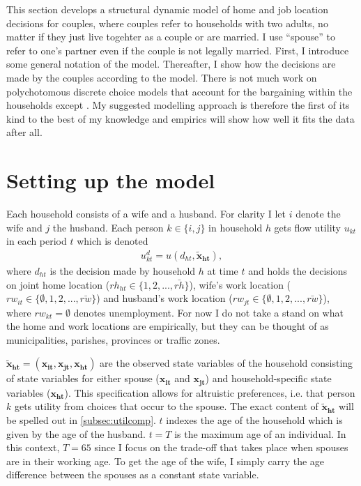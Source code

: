 This section develops a structural dynamic model of home and job location decisions for couples, where couples refer to households with two adults, no matter if they just live togehter as a couple or are married. I use ``spouse'' to refer to one's partner even if the couple is not legally married. First, I introduce some general notation of the model. Thereafter, I show how the decisions are made by the couples according to the model. There is not much work on polychotomous discrete choice models that account for the bargaining within the households except \cite{Gemici2011}. My suggested modelling approach is therefore the first of its kind to the best of my knowledge and empirics will show how well it fits the data after all.

\section{Setting up the model}
Each household consists of a wife and a husband. For clarity I let $i$ denote the wife and $j$ the husband. Each person $k\in\{i,j\}$ in household $h$ gets flow utility $u_{kt}$ in each period $t$ which is denoted
\begin{align*}
u_{kt}^d = u(d_{ht},\boldsymbol{\tilde{x}_{ht}}),
\end{align*}
where $d_{ht}$ is the decision made by household $h$ at time $t$ and holds the decisions on joint home location ($rh_{ht}\in \{1,2,...,\bar{rh}\}$), wife's work location ($rw_{it}\in \{\emptyset,1,2,...,\bar{rw}\}$) and husband's work location ($rw_{jt}\in \{\emptyset,1,2,...,\bar{rw}\}$), where $rw_{kt}=\emptyset$ denotes unemployment. For now I do not take a stand on what the home and work locations are empirically, but they can be thought of as municipalities, parishes, provinces or traffic zones.

$\boldsymbol{\tilde{x}_{ht}}=(\boldsymbol{x_{it}},\boldsymbol{x_{jt}},\boldsymbol{x_{ht}})$ are the observed state variables of the household consisting of state variables for either spouse ($\boldsymbol{x_{it}}$ and $\boldsymbol{x_{jt}}$) and household-specific state variables ($\boldsymbol{x_{ht}}$). This specification allows for altruistic preferences, i.e. that person $k$ gets utility from choices that occur to the spouse. The exact content of $\boldsymbol{\tilde{x}_{ht}}$ will be spelled out in \autoref{subsec:utilcomp}. $t$ indexes the age of the household which is given by the age of the husband. $t=T$ is the maximum age of an individual. In this context, $T=65$ since I focus on the trade-off that takes place when spouses are in their working age. To get the age of the wife, I simply carry the age difference between the spouses as a constant state variable. 

